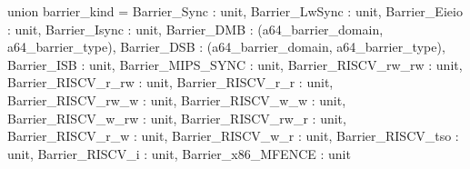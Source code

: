 union barrier_kind = {
  Barrier_Sync : unit,
  Barrier_LwSync : unit,
  Barrier_Eieio : unit,
  Barrier_Isync : unit,
  Barrier_DMB : (a64_barrier_domain, a64_barrier_type),
  Barrier_DSB : (a64_barrier_domain, a64_barrier_type),
  Barrier_ISB : unit,
  Barrier_MIPS_SYNC : unit,
  Barrier_RISCV_rw_rw : unit,
  Barrier_RISCV_r_rw : unit,
  Barrier_RISCV_r_r : unit,
  Barrier_RISCV_rw_w : unit,
  Barrier_RISCV_w_w : unit,
  Barrier_RISCV_w_rw : unit,
  Barrier_RISCV_rw_r : unit,
  Barrier_RISCV_r_w : unit,
  Barrier_RISCV_w_r : unit,
  Barrier_RISCV_tso : unit,
  Barrier_RISCV_i : unit,
  Barrier_x86_MFENCE : unit
}
